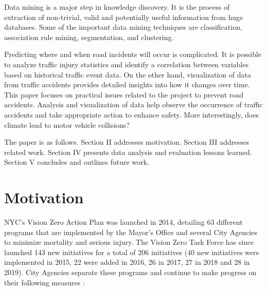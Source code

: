 \documentclass[conference]{IEEEtran}
\begin{document}
Data mining is a major step in knowledge discovery.  It is the process of extraction of non-trivial, valid and potentially useful information from huge databases. Some of the important data mining techniques are classification, association rule mining, segmentation, and clustering. 

Predicting where and when road incidents will occur is complicated. It is possible to analyze traffic injury statistics and identify a correlation between variables based on historical traffic event data. On the other hand, visualization of data from traffic accidents provides detailed insights into how it changes over time. This paper focuses on practical issues related to the project to prevent road accidents. Analysis and visualization of data help observe the occurrence of traffic accidents and take appropriate action to enhance safety.  More interestingly, does climate lead to motor vehicle collisions? 

The paper is as follows. Section II addresses motivation. Section III addresses related work. Section IV presents data analysis and evaluation lessons learned. Section V concludes and outlines future work. 
%
%
%
\section{Motivation}
NYC’s Vision Zero Action Plan was launched in 2014, detailing 63 different programs that are implemented by the Mayor's Office and several City Agencies to minimize mortality and serious injury. The Vision Zero Task Force has since launched 143 new initiatives for a total of 206 initiatives (40 new initiatives were implemented in 2015, 22 were added in 2016, 26 in 2017, 27 in 2018 and 28 in 2019).  City Agencies separate these programs and continue to make progress on their following measures \cite{VisionZeroInitiative}:     
\end{document}

